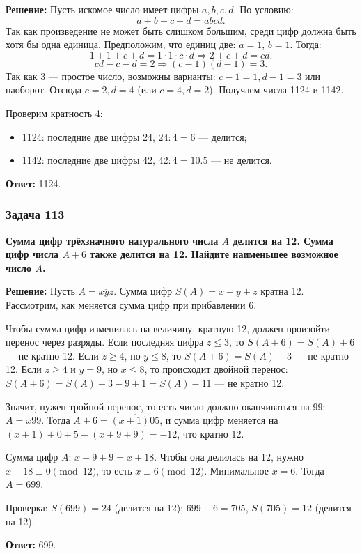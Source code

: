 \documentclass[12pt, a4paper]{article}
\begin{document}
\textbf{Решение:}
Пусть искомое число имеет цифры $a, b, c, d$. По условию:
\[
a+b+c+d = abcd.
\]
Так как произведение не может быть слишком большим, среди цифр должна быть хотя бы одна единица. Предположим, что единиц две: $a = 1$, $b = 1$. Тогда:
\[
1 + 1 + c + d = 1 \cdot 1 \cdot c \cdot d \Rightarrow 2 + c + d = cd.
\]
\[
cd - c - d = 2 \Rightarrow (c-1)(d-1) = 3.
\]
Так как 3 — простое число, возможны варианты: $c-1=1, d-1=3$ или наоборот. Отсюда $c=2, d=4$ (или $c=4, d=2$). Получаем числа 1124 и 1142.

Проверим кратность 4:
\begin{itemize}
    \item 1124: последние две цифры 24, $24 : 4 = 6$ — делится;
    \item 1142: последние две цифры 42, $42 : 4 = 10.5$ — не делится.
\end{itemize}

\textbf{Ответ:} 1124.

\subsubsection*{Задача 113}
\textbf{Сумма цифр трёхзначного натурального числа $A$ делится на 12. Сумма цифр числа $A + 6$ также делится на 12. Найдите наименьшее возможное число $A$.}

\textbf{Решение:}
Пусть $A = \overline{xyz}$. Сумма цифр $S(A) = x+y+z$ кратна 12. Рассмотрим, как меняется сумма цифр при прибавлении 6.

Чтобы сумма цифр изменилась на величину, кратную 12, должен произойти перенос через разряды. Если последняя цифра $z \le 3$, то $S(A+6) = S(A) + 6$ — не кратно 12. Если $z \ge 4$, но $y \le 8$, то $S(A+6) = S(A) - 3$ — не кратно 12. Если $z \ge 4$ и $y = 9$, но $x \le 8$, то происходит двойной перенос: $S(A+6) = S(A) - 3 - 9 + 1 = S(A) - 11$ — не кратно 12.

Значит, нужен тройной перенос, то есть число должно оканчиваться на 99: $A = \overline{x99}$. Тогда $A + 6 = \overline{(x+1)05}$, и сумма цифр меняется на $(x+1) + 0 + 5 - (x + 9 + 9) = -12$, что кратно 12.

Сумма цифр $A$: $x + 9 + 9 = x + 18$. Чтобы она делилась на 12, нужно $x + 18 \equiv 0 \pmod{12}$, то есть $x \equiv 6 \pmod{12}$. Минимальное $x = 6$. Тогда $A = 699$.

Проверка: $S(699) = 24$ (делится на 12); $699 + 6 = 705$, $S(705) = 12$ (делится на 12).

\textbf{Ответ:} 699.
\end{document}
